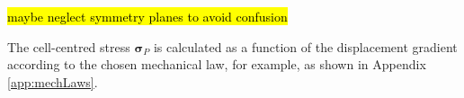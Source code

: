 \documentclass[sn-mathphys,Numbered]{sn-jnl}%
\newcommand{\bb}{\boldsymbol}
\begin{document}
\hl{maybe neglect symmetry planes to avoid confusion}

The cell-centred stress $\bb{\sigma}_P$ is calculated as a function of the displacement gradient according to the chosen mechanical law, for example, as shown in Appendix \ref{app:mechLaws}.


\end{document}
